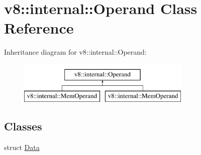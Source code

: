 \hypertarget{classv8_1_1internal_1_1Operand}{}\section{v8\+:\+:internal\+:\+:Operand Class Reference}
\label{classv8_1_1internal_1_1Operand}
Inheritance diagram for v8\+:\+:internal\+:\+:Operand\+:\begin{figure}[H]
\begin{center}
\leavevmode
\includegraphics[height=2.000000cm]{classv8_1_1internal_1_1Operand}
\end{center}
\end{figure}
\subsection*{Classes}
\begin{DoxyCompactItemize}
\item 
struct \mbox{\hyperlink{structv8_1_1internal_1_1Operand_1_1Data}{Data}}
\end{DoxyCompactItemize}
